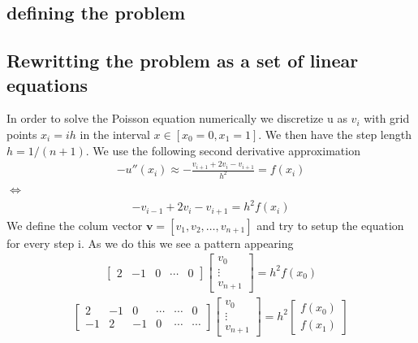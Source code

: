 \documentclass[american,a4paper,12pt]{article}
\renewcommand{\vec}[1]{\mathbf{#1}} %
\begin{document}
  \subsection{defining the problem}

  \subsection{Rewritting the problem as a set of linear equations}
  In order to solve the Poisson equation numerically we discretize u as $v_i$ with grid points $x_i = ih$ in the interval $x \in [x_0 = 0,x_1 = 1]$. We then have the step length $h = 1/(n + 1)$. We use the following second derivative approximation
  \begin{align*}
    -u''(x_i) \approx -\frac{v_{i+1} + 2v_i - v_{i+1}}{h^2} =  f(x_i)
  \end{align*}
  $\Longleftrightarrow$
  \begin{align*}
    -v_{i-1} + 2v_i - v_{i+1} = h^2f(x_i)
  \end{align*}
  We define the colum vector $\vec{v} = [v_1, v_2, \hdots, v_{n+1}]$ and try to setup the equation for every step i. As we do this we see a pattern appearing
  \begin{align*}
        \begin{bmatrix}
          2 & -1 & 0 & \cdots & 0
        \end{bmatrix}
        \begin{bmatrix}
          v_0 \\
          \vdots \\
          v_{n+1}
        \end{bmatrix}
  = h^2f(x_0)
  \end{align*}
  \begin{align*}
        \begin{bmatrix}
          2 & -1 & 0 & \cdots & \cdots & 0 \\
          -1 & 2 & -1 & 0 & \cdots & \cdots
        \end{bmatrix}
        \begin{bmatrix}
          v_0 \\
          \vdots \\
          v_{n+1}
        \end{bmatrix}
  = h^2
        \begin{bmatrix}
          f(x_0) \\
          f(x_1)
        \end{bmatrix}
  \end{align*}
\end{document}
